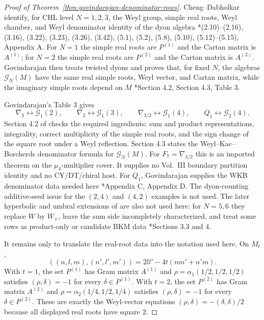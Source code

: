 \documentclass[11pt]{memoir}
\begin{document}
\begin{proof}[Proof of Theorem~\ref{thm:govindarajan-denominator-rows}]
Cheng--Dabholkar identify, for CHL level $N=1,2,3$, the Weyl group,
simple real roots, Weyl chamber, and Weyl denominator identity of the
dyon algebra
\cite{CD09BKM}*{(2.10)--(2.16), (3.16), (3.22), (3.23), (3.26),
(3.42), (5.1), (5.2), (5.8), (5.10), (5.12)--(5.15), Appendix A}.
For $N=1$ the simple real roots are
$P^{(1)}$ and the Cartan matrix is $A^{(1)}$; for $N=2$ the simple real
roots are $P^{(2)}$ and the Cartan matrix is $A^{(2)}$.
Govindarajan then treats twisted dyons and proves that, for fixed $N$,
the algebras $\mathcal G_N(M)$ have the same real simple roots, Weyl
vector, and Cartan matrix, while the imaginary simple roots depend on
$M$ \cite{Gov11BKM}*{Section 4.2, Section 4.3, Table 3}.

Govindarajan's Table 3 gives
$$
\nabla_3\longleftrightarrow\mathcal G_1(2),\qquad
\nabla_2\longleftrightarrow\mathcal G_1(3),\qquad
\nabla_{3/2}\longleftrightarrow\mathcal G_1(4),\qquad
Q_1\longleftrightarrow\mathcal G_2(4).
$$
Section 4.2 of \cite{Gov11BKM} checks the required ingredients: sum
and product representations, integrality, correct multiplicity of the
simple real roots, and the sign change of the square root under a Weyl
reflection.  Section 4.3 states the Weyl--Kac--Borcherds denominator
formula for $\mathcal G_N(M)$.
For $F_7=\nabla_{3/2}$ this is an imported theorem on the
$\mu_4$-multiplier cover.  It supplies no Vol.~III boundary partition
identity and no CY/DT/chiral host.
For $Q_1$, Govindarajan supplies the WKB denominator data needed here
\cite{Gov11BKM}*{Appendix C, Appendix D}.
The dyon-counting additive-seed issue for the $(2,4)$ and $(4,2)$
examples is not used.
The later hyperbolic and umbral extensions of \cite{GovSam19} are also
not used here: for $N=5,6$ they replace $W$ by $W_+$, leave the sum
side incompletely characterized, and treat some rows as product-only or
candidate BKM data \cite{GovSam19}*{Sections 3.3 and 4}.

It remains only to translate the real-root data into the notation used
here.  On $M_t$,
$$
((n,l,m),(n',l',m'))=2ll'-4t(nm'+n'm).
$$
With $t=1$, the set $P^{(1)}$ has Gram matrix $A^{(1)}$ and
$\rho=\alpha_1(1/2,1/2,1/2)$ satisfies
$(\rho,\delta)=-1$ for every $\delta\in P^{(1)}$.  With $t=2$, the set
$P^{(2)}$ has Gram matrix $A^{(2)}$ and
$\rho=\alpha_2(1/4,1/2,1/4)$ satisfies
$(\rho,\delta)=-1$ for every $\delta\in P^{(2)}$.  These are exactly
the Weyl-vector equations
$(\rho,\delta)=-(\delta,\delta)/2$ because all displayed real roots
have square $2$.
\end{proof}
\end{document}
